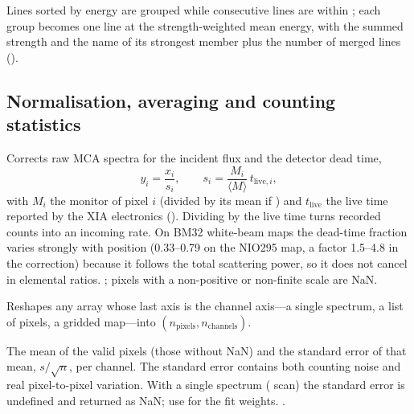 Lines sorted by energy are grouped while consecutive lines are within ; each group
becomes one line at the strength-weighted mean energy, with the summed strength and the name
of its strongest member plus the number of merged lines ().

\subsection{Normalisation, averaging and counting statistics}

Corrects raw MCA spectra for the incident flux and the detector dead time,
\begin{equation}
  y_i = \frac{x_i}{s_i}, \qquad s_i = \frac{M_i}{\langle M\rangle}\,t_{\mathrm{live},i},
\end{equation}
with $M_i$ the monitor of pixel $i$ (divided by its mean if ) and
$t_\mathrm{live}$ the live time reported by the XIA electronics ().
Dividing by the live time turns recorded counts into an incoming rate. On BM32 white-beam
maps the dead-time fraction varies strongly with position (0.33--0.79 on the NIO295 map, a
factor 1.5--4.8 in the correction) because it follows the total scattering power, so it does
not cancel in elemental ratios.
 ; pixels with a non-positive or non-finite scale are NaN.

Reshapes any array whose last axis is the channel axis---a single spectrum, a list of
pixels, a gridded map---into $(n_\mathrm{pixels}, n_\mathrm{channels})$.

The mean of the valid pixels (those without NaN) and the standard error of that mean,
$s/\sqrt n$, per channel. The standard error contains both counting noise and real
pixel-to-pixel variation. With a single spectrum ( scan) the standard error is
undefined and returned as NaN; use  for the fit weights.
 .

